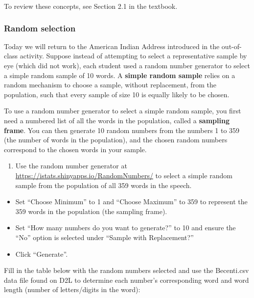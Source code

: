 \documentclass[
]{report}
\providecommand{\tightlist}{%
  \setlength{\itemsep}{0pt}\setlength{\parskip}{0pt}}
\begin{document}
To review these concepts, see Section 2.1 in the textbook.

\hypertarget{random-selection}{%
\subsubsection*{Random selection}\label{random-selection}}

Today we will return to the American Indian Address introduced in the out-of-class activity. Suppose instead of attempting to select a representative sample by eye (which did not work), each student used a random number generator to select a simple random sample of 10 words. A \textbf{simple random sample} relies on a random mechanism to choose a sample, without replacement, from the population, such that every sample of size 10 is equally likely to be chosen.

To use a random number generator to select a simple random sample, you first need a numbered list of all the words in the population, called a \textbf{sampling frame}. You can then generate 10 random numbers from the numbers 1 to 359 (the number of words in the population), and the chosen random numbers correspond to the chosen words in your sample.

\begin{enumerate}
\def\labelenumi{\arabic{enumi}.}
\tightlist
\item
  Use the random number generator at \url{https://istats.shinyapps.io/RandomNumbers/} to select a simple random sample from the population of all 359 words in the speech.
\end{enumerate}

\begin{itemize}
\item
  Set ``Choose Minimum'' to 1 and ``Choose Maximum'' to 359 to represent the 359 words in the population (the sampling frame).
\item
  Set ``How many numbers do you want to generate?'' to 10 and ensure the ``No'' option is selected under ``Sample with Replacement?''
\item
  Click ``Generate''.
\end{itemize}

\newpage

Fill in the table below with the random numbers selected and use the Becenti.csv data file found on D2L to determine each number's corresponding word and word length (number of letters/digits in the word):
\end{document}
